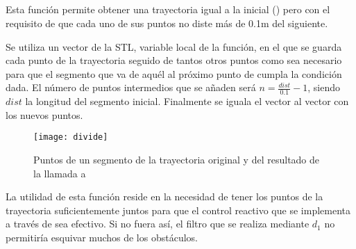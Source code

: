 %
%
%

\subsection{}

\noindent
{}

\noindent
Esta función permite obtener una trayectoria igual a la inicial () pero con el requisito de que cada uno de sus puntos no diste más de 0.1m del siguiente.


\noindent
Se utiliza un vector de la STL, variable local de la función, en el que se guarda cada punto de la trayectoria seguido de tantos otros puntos como sea necesario para que el segmento que va de aquél al próximo punto de  cumpla la condición dada. El número de puntos intermedios que se añaden será $n = \frac{dist}{0.1} - 1$, siendo $dist$ la longitud del segmento inicial. Finalmente se iguala el vector  al vector con los nuevos puntos.

\begin{figure}[h]
  \centering\texttt{[image: divide]}\\
  \caption{Puntos de un segmento de la trayectoria original y del resultado de la llamada a }\label{fg:divide}
\end{figure}

\vspace{0.2cm}

\noindent
La utilidad de esta función reside en la necesidad de tener los puntos de la trayectoria suficientemente juntos para que el control reactivo que se implementa a través de  sea efectivo. Si no fuera así, el filtro que se realiza mediante $d_{1}$ no permitiría esquivar muchos de los obstáculos.

